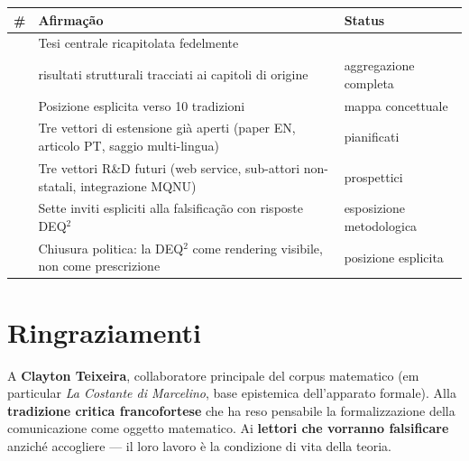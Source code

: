 {\def\LTcaptype{none} %
{\small\begin{longtable}[]{@{}
  >{\raggedright\arraybackslash}p{}
  >{\raggedright\arraybackslash}p{}
  >{\raggedright\arraybackslash}p{}@{}}
\toprule\noalign{}
\begin{minipage}[b]{\linewidth}\raggedright
\#
\end{minipage} & \begin{minipage}[b]{\linewidth}\raggedright
Afirmação
\end{minipage} & \begin{minipage}[b]{\linewidth}\raggedright
Status
\end{minipage} \\
\midrule\noalign{}
\endhead
\bottomrule\noalign{}
\endlastfoot
1 & Tesi centrale ricapitolata fedelmente & \Proved{} \\
2 & 21 risultati strutturali tracciati ai capitoli di origine &
\Proved{} aggregazione completa \\
3 & Posizione esplicita verso 10 tradizioni & \Hypoth{} mappa
concettuale \\
4 & Tre vettori di estensione già aperti (paper EN, articolo PT, saggio
multi-lingua) & \Proved{} pianificati \\
5 & Tre vettori R\&D futuri (web service, sub-attori non-statali,
integrazione MQNU) & \Conj{} prospettici \\
6 & Sette inviti espliciti alla falsificação con risposte DEQ$^2$ &
\Hypoth{} esposizione metodologica \\
7 & Chiusura politica: la DEQ$^2$ come rendering visibile, non come
prescrizione & \Hypoth{} posizione esplicita \\
\end{longtable}}
}



\section{Ringraziamenti}\label{ringraziamenti}

A \textbf{Clayton Teixeira}, collaboratore principale del corpus
matematico (em particular \emph{La Costante di Marcelino}, base
epistemica dell'apparato formale). Alla \textbf{tradizione critica
francofortese} che ha reso pensabile la formalizzazione della
comunicazione come oggetto matematico. Ai \textbf{lettori che vorranno
falsificare} anziché accogliere --- il loro lavoro è la condizione di
vita della teoria.


